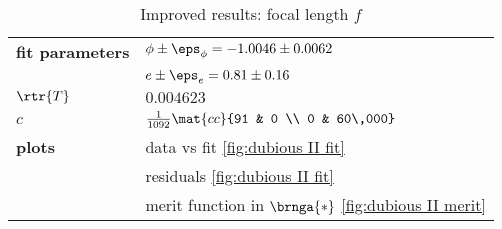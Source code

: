 \begin{table}[t]
	\begin{center}
		\begin{tabular}{ll}
		  \bf{fit parameters} & $\phi\pm\eps_{\phi} = -1.0046\pm0.0062$ \\
		                      & $e\pm\eps_{e} = 0.81\pm0.16$ \\[5pt]
		  $\rtr{T}$ & $0.004623$\\[5pt]
		  $c$ & $\frac{1}{1092} \mat{cc}{91 & 0 \\ 0 & 60\,000}$\\[8pt]
		  \bf{plots} & data vs fit \eqref{fig:dubious II fit} \\
		             & residuals \eqref{fig:dubious II fit} \\
		             & merit function in $\brnga{*}$ \eqref{fig:dubious II merit} \\[5pt]
		\end{tabular}
	\end{center}
	\label{tab:results dubious II}
	\caption{Improved results: focal length $f$}
\end{table}%

\endinput  %

